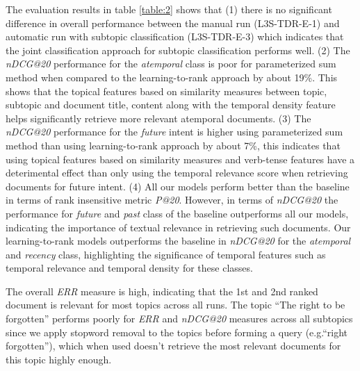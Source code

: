 \documentclass{sig-alternate}
\begin{document}
The evaluation results in table \ref{table:2} shows that (1) there is no significant difference in overall performance between the manual run (\textsf{L3S-TDR-E-1}) and automatic run with subtopic classification (\textsf{L3S-TDR-E-3}) which indicates that the joint classification approach for subtopic classification performs well. (2) The \textit{nDCG@20} performance for the \textit{atemporal} class is poor for parameterized sum method when compared to the learning-to-rank approach by about 19\%. This shows that the topical features based on similarity measures between topic, subtopic and document title, content along with the temporal density feature helps significantly retrieve more relevant atemporal documents. (3) The \textit{nDCG@20} performance for the \textit{future} intent is higher using parameterized sum method than using learning-to-rank approach by about 7\%, this indicates that using topical features based on similarity measures and verb-tense features have a deterimental effect than only using the temporal relevance score when retrieving documents for future intent. (4) All our models perform better than the baseline in terms of rank insensitive metric \textit{P@20}. However, in terms of \textit{nDCG@20} the performance for \textit{future} and \textit{past} class of the baseline outperforms all our models, indicating the importance of textual relevance in retrieving such documents. Our learning-to-rank models outperforms the baseline in \textit{nDCG@20} for the \textit{atemporal} and \textit{recency} class, highlighting the significance of temporal features such as temporal relevance and temporal density for these classes. 

The overall \textit{ERR} measure is high, indicating that the 1st and 2nd ranked document is relevant for most topics across all runs. The topic ``The right to be forgotten'' performs poorly for \textit{ERR} and \textit{nDCG@20} measures across all subtopics since we apply stopword removal to the topics before forming a query (e.g.``right forgotten''), which when used doesn't retrieve the most relevant documents for this topic highly enough.
\end{document}
